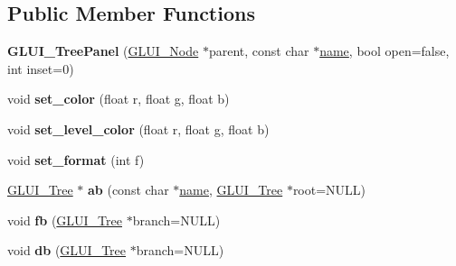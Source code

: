 \subsection*{Public Member Functions}
\begin{DoxyCompactItemize}
\item 
\hypertarget{classGLUI__TreePanel_a17ff7ac24968bdad9adfd4356361925e}{{\bfseries G\-L\-U\-I\-\_\-\-Tree\-Panel} (\hyperlink{classGLUI__Node}{G\-L\-U\-I\-\_\-\-Node} $\ast$parent, const char $\ast$\hyperlink{classGLUI__Control_aa95b97d50df45335fc33f0af03958eb3}{name}, bool open=false, int inset=0)}\label{classGLUI__TreePanel_a17ff7ac24968bdad9adfd4356361925e}

\item 
\hypertarget{classGLUI__TreePanel_af87e1c64a80d4179e48dc93f513ca41d}{void {\bfseries set\-\_\-color} (float r, float g, float b)}\label{classGLUI__TreePanel_af87e1c64a80d4179e48dc93f513ca41d}

\item 
\hypertarget{classGLUI__TreePanel_a8b951971bf5b8416624ff02fa60c0528}{void {\bfseries set\-\_\-level\-\_\-color} (float r, float g, float b)}\label{classGLUI__TreePanel_a8b951971bf5b8416624ff02fa60c0528}

\item 
\hypertarget{classGLUI__TreePanel_ad695187114e8a0de9cf42c15ab1203c9}{void {\bfseries set\-\_\-format} (int f)}\label{classGLUI__TreePanel_ad695187114e8a0de9cf42c15ab1203c9}

\item 
\hypertarget{classGLUI__TreePanel_aecf342fd8eae7b20039255f1c302b1c4}{\hyperlink{classGLUI__Tree}{G\-L\-U\-I\-\_\-\-Tree} $\ast$ {\bfseries ab} (const char $\ast$\hyperlink{classGLUI__Control_aa95b97d50df45335fc33f0af03958eb3}{name}, \hyperlink{classGLUI__Tree}{G\-L\-U\-I\-\_\-\-Tree} $\ast$root=N\-U\-L\-L)}\label{classGLUI__TreePanel_aecf342fd8eae7b20039255f1c302b1c4}

\item 
\hypertarget{classGLUI__TreePanel_ae4b712e959b301b046ecc8fee39a3161}{void {\bfseries fb} (\hyperlink{classGLUI__Tree}{G\-L\-U\-I\-\_\-\-Tree} $\ast$branch=N\-U\-L\-L)}\label{classGLUI__TreePanel_ae4b712e959b301b046ecc8fee39a3161}

\item 
\hypertarget{classGLUI__TreePanel_ab9ab4943caa74579295980862a660eb0}{void {\bfseries db} (\hyperlink{classGLUI__Tree}{G\-L\-U\-I\-\_\-\-Tree} $\ast$branch=N\-U\-L\-L)}\label{classGLUI__TreePanel_ab9ab4943caa74579295980862a660eb0}


\end{DoxyCompactItemize}
